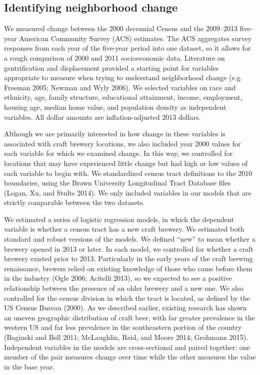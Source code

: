 \documentclass[]{article}
\begin{document}
\subsection{Identifying neighborhood
change}\label{identifying-neighborhood-change}

We measured change between the 2000 decennial Census and the 2009--2013
five-year American Community Survey (ACS) estimates. The ACS aggregates
survey responses from each year of the five-year period into one
dataset, so it allows for a rough comparison of 2000 and 2011
socioeconomic data. Literature on gentrification and displacement
provided a starting point for variables appropriate to measure when
trying to understand neighborhood change (e.g. Freeman 2005; Newman and
Wyly 2006). We selected variables on race and ethnicity, age, family
structure, educational attainment, income, employment, housing age,
median home value, and population density as independent variables. All
dollar amounts are inflation-adjusted 2013 dollars.

Although we are primarily interested in how change in these variables is
associated with craft brewery locations, we also included year 2000
values for each variable for which we examined change. In this way, we
controlled for locations that may have experienced little change but had
high or low values of each variable to begin with. We standardized
census tract definitions to the 2010 boundaries, using the Brown
University Longitudinal Tract Database files (Logan, Xu, and Stults
2014). We only included variables in our models that are strictly
comparable between the two datasets.

We estimated a series of logistic regression models, in which the
dependent variable is whether a census tract has a new craft brewery. We
estimated both standard and robust versions of the models. We defined
``new'' to mean whether a brewery opened in 2013 or later. In each
model, we controlled for whether a craft brewery existed prior to 2013.
Particularly in the early years of the craft brewing renaissance,
brewers relied on existing knowledge of those who came before them in
the industry (Ogle 2006; Acitelli 2013), so we expected to see a
positive relationship between the presence of an older brewery and a new
one. We also controlled for the census division in which the tract is
located, as defined by the US Census Bureau (2000). As we described
earlier, existing research has shown an uneven geographic distribution
of craft beer, with far greater prevalence in the western US and far
less prevalence in the southeastern portion of the country (Baginski and
Bell 2011; McLaughlin, Reid, and Moore 2014; Grohmann 2015). Independent
variables in the models are cross-sectional and paired together: one
member of the pair measures change over time while the other measures
the value in the base year.
\end{document}
